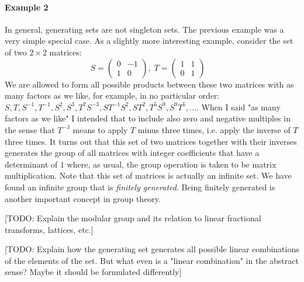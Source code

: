 \paragraph{Example 2} In general, generating sets are not singleton sets. The previous example was a very simple special case. As a slightly more interesting example, consider the set of two $2 \times 2$ matrices:
\begin{equation}
S = \begin{pmatrix}  0 & -1 \\  1  &  0  \end{pmatrix}, \;
T = \begin{pmatrix}  1 &  1 \\  0  &  1  \end{pmatrix} \quad
\end{equation}
We are allowed to form all possible products between these two matrices with as many factors as we like, for example, in no particular order: $S, T, S^{-1}, T^{-1}, S^2, S^3, T^7 S^{-3}, S T^{-1} S^2, S T^2, T^5 S^9, S^9 T^5, \ldots$. When I said "as many factors as we like" I intended that to include also zero and negative multiples in the sense that $T^{-3}$ means to apply $T$ minus three times, i.e. apply the inverse of $T$ three times. It turns out that this set of two matrices together with their inverses generates the group of all matrices with integer coefficients that have a determinant of $1$ where, as usual, the group operation is taken to be matrix multiplication. Note that this set of matrices is actually an infinite set. We have found an infinite group that is \emph{finitely generated}. Being finitely generated is another important concept in group theory.

[TODO: Explain the modular group and its relation to linear fractional transforms, lattices, etc.]

[TODO: Explain how the generating set generates all possible linear combinations of the elements of the set. But what even is a "linear combination" in the abstract sense? Maybe it should be formulated differently]

